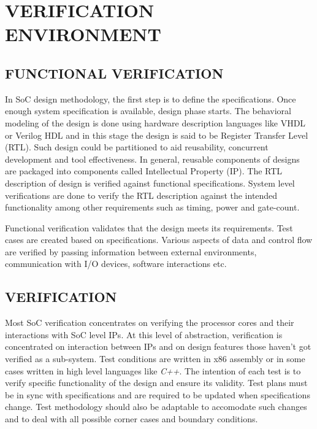 \chapter{VERIFICATION ENVIRONMENT}
\label{chap:verification.tex}

\section {FUNCTIONAL VERIFICATION}

In SoC design methodology, the first step is to define the specifications. Once enough system specification is available, design phase starts. The behavioral modeling of the design is done using hardware description languages like VHDL or Verilog HDL and in this stage the design is said to be Register Transfer Level (RTL). Such design could be partitioned to aid reusability, concurrent development and tool effectiveness. In general, reusable components of designs are packaged into components called Intellectual Property (IP). The RTL description of design is verified against functional specifications. System level verifications are done to verify the RTL description against the intended functionality among other requirements such as timing, power and gate-count. 



Functional verification validates that the design meets its requirements. Test cases are created based on specifications. Various aspects of data and control flow are verified by passing information between external environments, communication with I/O devices,  software interactions etc. 
 
\section {VERIFICATION}

Most SoC verification concentrates on verifying the processor cores and their interactions with SoC level IPs. At this level of abstraction, verification is concentrated on interaction between IPs and on design features those haven't got verified as a sub-system.  Test conditions are written in x86 assembly or in some cases written in high level languages like {\it C++}. The intention of each test is to verify specific functionality of the design and ensure its validity. Test plans must be in sync with specifications and are required to be updated when specifications change. Test methodology should also be adaptable to accomodate such changes and to deal with all possible corner cases and boundary conditions.

